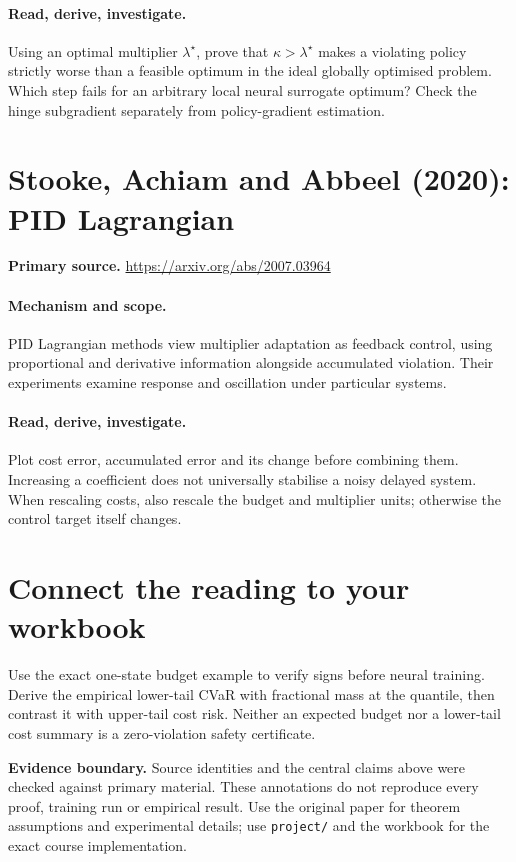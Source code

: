 \documentclass[11pt]{scrartcl}
\begin{document}
\paragraph{Read, derive, investigate.} Using an optimal multiplier $\lambda^\star$, prove that $\kappa>\lambda^\star$ makes a violating policy strictly worse than a feasible optimum in the ideal globally optimised problem. Which step fails for an arbitrary local neural surrogate optimum? Check the hinge subgradient separately from policy-gradient estimation.

\section{Stooke, Achiam and Abbeel (2020): PID Lagrangian}
\noindent\textbf{Primary source.} \url{https://arxiv.org/abs/2007.03964}

\paragraph{Mechanism and scope.} PID Lagrangian methods view multiplier adaptation as feedback control, using proportional and derivative information alongside accumulated violation. Their experiments examine response and oscillation under particular systems.

\paragraph{Read, derive, investigate.} Plot cost error, accumulated error and its change before combining them. Increasing a coefficient does not universally stabilise a noisy delayed system. When rescaling costs, also rescale the budget and multiplier units; otherwise the control target itself changes.

\section*{Connect the reading to your workbook}
Use the exact one-state budget example to verify signs before neural training. Derive the empirical lower-tail CVaR with fractional mass at the quantile, then contrast it with upper-tail cost risk. Neither an expected budget nor a lower-tail cost summary is a zero-violation safety certificate.

\noindent\textbf{Evidence boundary.} Source identities and the central claims above were checked against primary material. These annotations do not reproduce every proof, training run or empirical result. Use the original paper for theorem assumptions and experimental details; use \texttt{project/} and the workbook for the exact course implementation.
\end{document}
